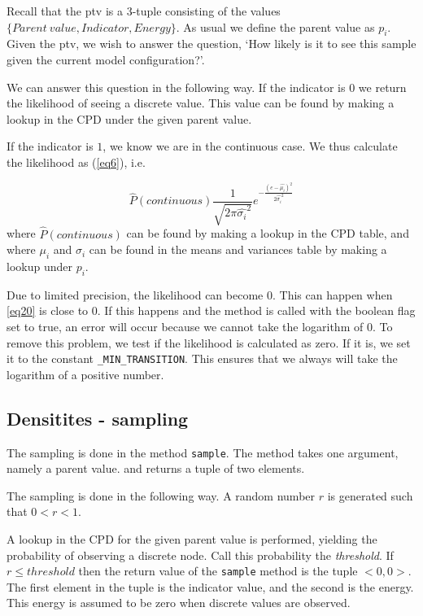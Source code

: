 \documentclass[10pt, journal, compsocconf,a4paper]{IEEEtran}
\begin{document}
Recall that the ptv is a 3-tuple consisting of the values $\{Parent\ value, Indicator, Energy\}$. As usual we define the parent value as $p_i$. Given the ptv, we wish to answer the question, `How likely is it to see this sample given the current model configuration?'. 

We can answer this question in the following way.  If the indicator is $0$ we return the likelihood of seeing a discrete value. This value can be found by making a lookup in the CPD under the given parent value. 

If the indicator is $1$, we know we are in the continuous case. We thus calculate the likelihood as (\ref{eq6}), i.e.

\begin{equation}
  \hat{P}(continuous) \frac{1}{\sqrt{2\pi\hat{\sigma_i}^2}} e^{ -\frac{(e-\hat{\mu_i})^2}{2\hat{\sigma_i}^2} }
  \label{eq20}
\end{equation}
where $\hat{P}(continuous)$ can be found by making a lookup in the CPD table, and where $\mu_i$ and $\sigma_i$ can be found in the means and variances table by making a lookup under $p_i$.


Due to limited precision, the likelihood can become $0$. This can happen when \ref{eq20} is close to $0$. If this happens and the method is called with the boolean flag set to true, an error will occur because we cannot take the logarithm of 0. To remove this problem, we test if the likelihood is calculated as zero. If it is, we set it to the constant \texttt{\_MIN\_TRANSITION}. This ensures that we always will take the logarithm of a positive number.



\subsection{Densitites - sampling} %
\label{sub:densitites_sampling}
The sampling is done in the method \texttt{sample}. The method takes one argument, namely a parent value. and returns a tuple of two elements. 

The sampling is done in the following way. A random number $r$ is generated such that $0 < r < 1$. 

A lookup in the CPD for the given parent value is performed, yielding the probability of observing a discrete node. Call this probability the \emph{threshold}. If $r \leq threshold$ then the return value of the \texttt{sample} method is the tuple $<0,0>$. The first element in the tuple is the indicator value, and the second is the energy. This energy is assumed to be zero when discrete values are observed.
\end{document}
